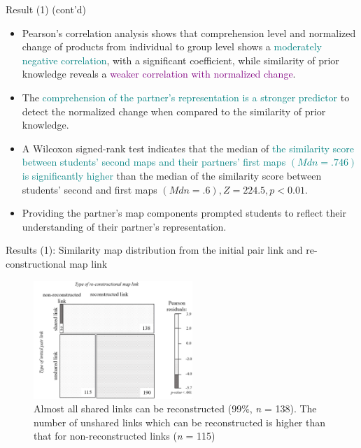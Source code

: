 \begin{frame}{Result (1) (cont'd)}

\begin{itemize}
    
    \item <1-2> {\small Pearson’s correlation analysis shows that comprehension level and normalized change of products from individual to group level shows a \textcolor{teal}{moderately negative correlation}, with a significant coefficient, while similarity of prior knowledge reveals a \textcolor{purple}{weaker correlation with normalized change}.} 
    \item <2> {\small The \textcolor{teal}{comprehension of the partner’s representation is a stronger predictor} to detect the normalized change when compared to the similarity of prior knowledge.}
    \item <3-4> {\small A Wilcoxon signed-rank test indicates that the median of \textcolor{teal}{the similarity score between students' second maps and their partners' first maps $(Mdn = .746)$ is significantly higher} than the median of the similarity score between students' second and first maps $(Mdn=.6), Z= 224.5, p<0.01$.}
    \item <4> {\small Providing the partner's map components prompted students to reflect their understanding of their partner's representation.}

\end{itemize}

\end{frame}

\begin{frame}{Results (1): Similarity map distribution from the initial pair link and re-constructional map link}
\begin{figure}[tb]
    \begin{center}
        \includegraphics[width=60mm]{images/a3_prior_comprehension_distribution.pdf}
    \end{center}
    \caption{Almost all shared links can be reconstructed (99\%, \textit{n} = 138). The number of unshared links which can be reconstructed is higher than that for non-reconstructed links (\textit{n} = 115)}
    \label{prior_comprehension_dist}
\end{figure}
\end{frame}

